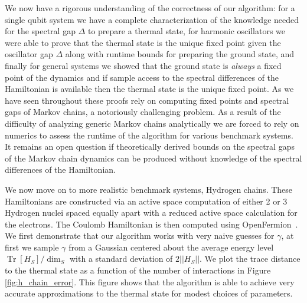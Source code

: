 \documentclass{article}
\newcommand{\brackets}[1]{\left[ #1 \right]}
\newcommand{\norm}[1]{\left|\left| #1 \right|\right|}
\DeclareMathOperator{\Tr}{Tr}
\newcommand{\trace}[1]{\Tr \brackets{ #1 }}
\begin{document}
We now have a rigorous understanding of the correctness of our algorithm: for a single qubit system we have a complete characterization of the knowledge needed for the spectral gap $\Delta$ to prepare a thermal state, for harmonic oscillators we were able to prove that the thermal state is the unique fixed point given the oscillator gap $\Delta$ along with runtime bounds for preparing the ground state, and finally for general systems we showed that the ground state is \emph{always} a fixed point of the dynamics and if sample access to the spectral differences of the Hamiltonian is available then the thermal state is the unique fixed point. As we have seen throughout these proofs rely on computing fixed points and spectral gaps of Markov chains, a notoriously challenging problem. As a result of the difficulty of analyzing generic Markov chains analytically we are forced to rely on numerics to assess the runtime of the algorithm for various benchmark systems. It remains an open question if theoretically derived bounds on the spectral gaps of the Markov chain dynamics can be produced without knowledge of the spectral differences of the Hamiltonian. 


We now move on to more realistic benchmark systems, Hydrogen chains. These Hamiltonians are constructed via an active space computation of either 2 or 3 Hydrogen nuclei spaced equally apart with a reduced active space calculation for the electrons. The Coulomb Hamiltonian is then computed using OpenFermion~\cite{mcclean2020openfermion}. We first demonstrate that our algorithm works with very naive guesses for $\gamma$, at first we sample $\gamma$ from a Gaussian centered about the average energy level $\trace{H_S} / \dim_S$ with a standard deviation of $2 \norm{H_S}$. We plot the trace distance to the thermal state as a function of the number of interactions in Figure \ref{fig:h_chain_error}. This figure shows that the algorithm is able to achieve very accurate approximations to the thermal state for modest choices of parameters. 
\end{document}
